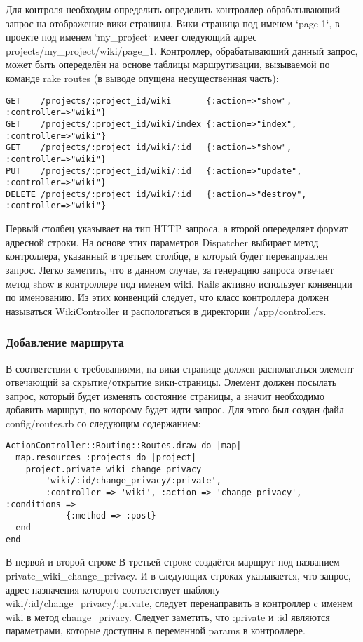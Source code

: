 Для контроля необходим определить определить контроллер
обрабатывающий запрос на отображение вики страницы. Вики-страница под именем
`page 1`, в проекте под именем `my\_project` имеет следующий адрес
projects/my\_project/wiki/page\_1. Контроллер, обрабатывающий данный запрос,
может быть опеределён на основе таблицы маршрутизации, вызываемой по команде
rake routes (в выводе опущена несущественная часть):
\small{\begin{lstlisting}
GET    /projects/:project_id/wiki       {:action=>"show", :controller=>"wiki"}
GET    /projects/:project_id/wiki/index {:action=>"index", :controller=>"wiki"}
GET    /projects/:project_id/wiki/:id   {:action=>"show", :controller=>"wiki"}
PUT    /projects/:project_id/wiki/:id   {:action=>"update", :controller=>"wiki"}
DELETE /projects/:project_id/wiki/:id   {:action=>"destroy", :controller=>"wiki"}
\end{lstlisting}}
Первый столбец указывает на тип HTTP запроса, а второй опеределяет формат
адресной строки. На основе этих параметров Dispatcher выбирает метод
контроллера, указанный в третьем столбце, в который будет перенаправлен запрос.
Легко заметить, что в данном случае, за генерацию запроса отвечает метод show в
контроллере под именем wiki. Rails активно использует конвенции по именованию.
Из этих конвенций следует, что класс контроллера должен называться
WikiController и распологаться в директории /app/controllers.

\subsubsection{Добавление маршрута}
В соответствии с требованиями, на вики-странице должен располагаться элемент
отвечающий за скрытие/открытие вики-страницы. Элемент должен посылать запрос,
который будет изменять состояние страницы, а значит необходимо добавить
маршрут, по которому будет идти запрос. Для этого был создан файл
config/routes.rb со следующим содержанием:
\small{
\begin{lstlisting}
ActionController::Routing::Routes.draw do |map|
  map.resources :projects do |project|
    project.private_wiki_change_privacy
        'wiki/:id/change_privacy/:private',
        :controller => 'wiki', :action => 'change_privacy',  :conditions =>
            {:method => :post}
  end
end
\end{lstlisting}}
В первой и второй строке В третьей строке создаётся маршрут под названием
private\_wiki\_change\_privacy. И в следующих строках указывается, что запрос,
адрес назначения которого соответствует шаблону
wiki/:id/change\_privacy/:private, следует перенаправить в контроллер c
именем wiki в метод change\_privacy. Следует заметить, что :private и :id
являются параметрами, которые доступны в переменной params в контроллере.

